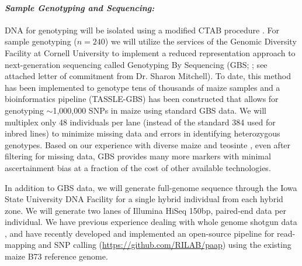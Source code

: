 \paragraph{\emph{Sample Genotyping and Sequencing:}}
DNA for genotyping will be isolated using a modified CTAB procedure \citep{Saghai-Maroof1984}.  For sample genotyping ($n=240$) we will utilize the services of the Genomic Diversity Facility at Cornell University to implement a reduced representation approach to next-generation sequencing called Genotyping By Sequencing (GBS; \citealt{Elshire2011}; see attached letter of commitment from Dr. Sharon Mitchell). To date, this method has been implemented to genotype tens of thousands of maize samples and a bioinformatics pipeline (TASSLE-GBS) has been constructed that allows for genotyping $\sim$1,000,000 SNPs in maize \citep{Glaubitz2014} using standard GBS data. 
We will multiplex only 48 individuals per lane (instead of the standard 384 used for inbred lines) to minimize missing data and errors in identifying heterozygous genotypes. 
Based on our experience with diverse maize and teosinte \citep[e.g.][]{Takuno15062015, mezmouk2014pattern}, even after filtering for missing data, GBS provides many more markers with minimal ascertainment bias at a fraction of the cost of other available technologies. 

In addition to GBS data, we will generate full-genome sequence through the Iowa State University DNA Facility for a single hybrid individual from each hybrid zone.  We will generate two lanes of Illumina HiSeq 150bp, paired-end data per individual.  
We have previous experience dealing with whole genome shotgun data \citep{Gore2009,Chia2012a,Hufford2012b,da2015origin}, and have recently developed and implemented an open-source pipeline for read-mapping and SNP calling (\url{https://github.com/RILAB/paap}) using the existing maize B73 reference genome. 

